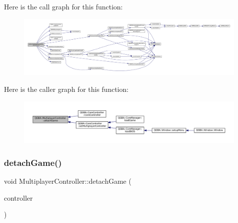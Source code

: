Here is the call graph for this function\+:
\nopagebreak
\begin{figure}[H]
\begin{center}
\leavevmode
\includegraphics[width=350pt]{class_q_g_b_a_1_1_multiplayer_controller_a58149beb11ba0c0970cf37f86e74c4f4_cgraph}
\end{center}
\end{figure}
Here is the caller graph for this function\+:
\nopagebreak
\begin{figure}[H]
\begin{center}
\leavevmode
\includegraphics[width=350pt]{class_q_g_b_a_1_1_multiplayer_controller_a58149beb11ba0c0970cf37f86e74c4f4_icgraph}
\end{center}
\end{figure}
\mbox{\label{class_q_g_b_a_1_1_multiplayer_controller_a4527bd49027a633ca073fa002d7492b3}} 
\subsubsection{\texorpdfstring{detach\+Game()}{detachGame()}}
{\footnotesize\ttfamily void Multiplayer\+Controller\+::detach\+Game (\begin{DoxyParamCaption}\item[{\mbox{\hyperlink{class_q_g_b_a_1_1_core_controller}{Core\+Controller}} $\ast$}]{controller }\end{DoxyParamCaption})}

